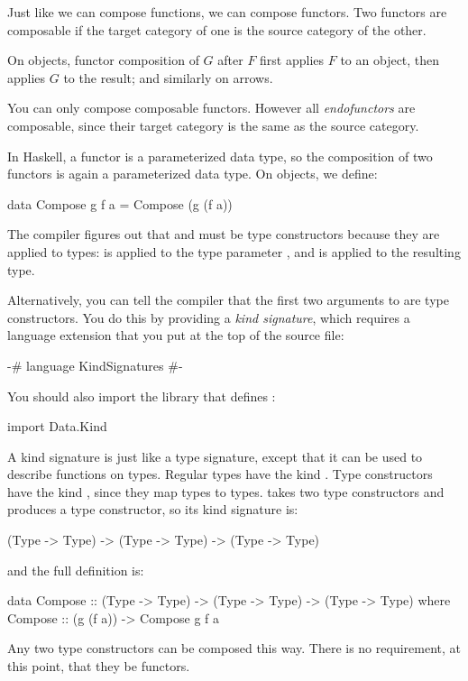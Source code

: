 \documentclass[DaoFP]{subfiles}
\begin{document}
Just like we can compose functions, we can compose functors. Two functors are composable if the target category of one is the source category of the other.

 On objects, functor composition of $G$ after $F$ first applies $F$ to an object, then applies $G$ to the result; and similarly on arrows.
 
 You can only compose composable functors. However all \emph{endofunctors} are composable, since their target category is the same as the source category.
 
 In Haskell, a functor is a parameterized data type, so the composition of two functors is again a parameterized data type. On objects, we define:
 \begin{haskell}
data Compose g f a = Compose (g (f a))
\end{haskell}
The compiler figures out that  and  must be type constructors because they are applied to types:  is applied to the type parameter , and  is applied to the resulting type.

Alternatively, you can tell the compiler that the first two arguments to  are type constructors. You do this by providing a \emph{kind signature}, which requires a language extension  that you put at the top of the source file:
\begin{haskell}
{-# language KindSignatures #-}
\end{haskell}
You should also import the  library that defines :
\begin{haskell}
import Data.Kind
\end{haskell}

A kind signature is just like a type signature, except that it can be used to describe functions on types. Regular types have the kind . Type constructors have the kind , since they map types to types.  takes two type constructors and produces a type constructor, so its kind signature is:
\begin{haskell}
(Type -> Type) -> (Type -> Type) -> (Type -> Type) 
\end{haskell}
and the full definition is:
\begin{haskell}
data Compose :: (Type -> Type) -> (Type -> Type) -> (Type -> Type) 
  where
    Compose :: (g (f a)) -> Compose g f a
\end{haskell}

Any two type constructors can be composed this way. There is no requirement, at this point, that they be functors. 
\end{document}
